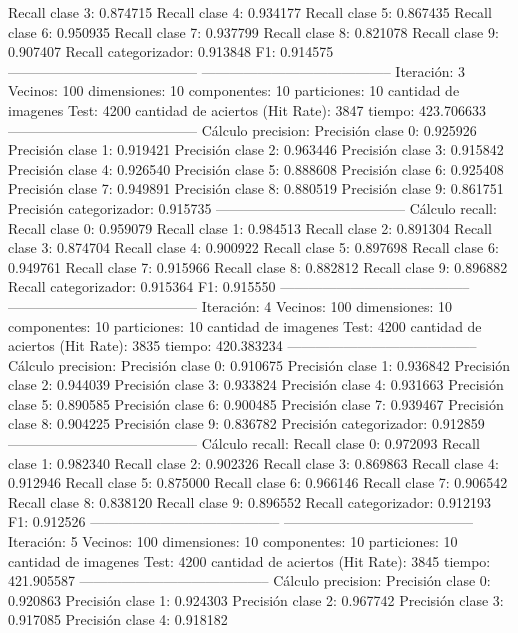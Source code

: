 Recall clase 3: 0.874715
Recall clase 4: 0.934177
Recall clase 5: 0.867435
Recall clase 6: 0.950935
Recall clase 7: 0.937799
Recall clase 8: 0.821078
Recall clase 9: 0.907407
Recall categorizador: 0.913848
F1: 0.914575
-----------------------------------------
-----------------------------------------
Iteración: 3
Vecinos: 100
dimensiones: 10
componentes: 10
particiones: 10
cantidad de imagenes Test: 4200
cantidad de aciertos (Hit Rate): 3847
tiempo: 423.706633
-----------------------------------------
Cálculo precision: 
Precisión clase 0: 0.925926
Precisión clase 1: 0.919421
Precisión clase 2: 0.963446
Precisión clase 3: 0.915842
Precisión clase 4: 0.926540
Precisión clase 5: 0.888608
Precisión clase 6: 0.925408
Precisión clase 7: 0.949891
Precisión clase 8: 0.880519
Precisión clase 9: 0.861751
Precisión categorizador: 0.915735
-----------------------------------------
Cálculo recall: 
Recall clase 0: 0.959079
Recall clase 1: 0.984513
Recall clase 2: 0.891304
Recall clase 3: 0.874704
Recall clase 4: 0.900922
Recall clase 5: 0.897698
Recall clase 6: 0.949761
Recall clase 7: 0.915966
Recall clase 8: 0.882812
Recall clase 9: 0.896882
Recall categorizador: 0.915364
F1: 0.915550
-----------------------------------------
-----------------------------------------
Iteración: 4
Vecinos: 100
dimensiones: 10
componentes: 10
particiones: 10
cantidad de imagenes Test: 4200
cantidad de aciertos (Hit Rate): 3835
tiempo: 420.383234
-----------------------------------------
Cálculo precision: 
Precisión clase 0: 0.910675
Precisión clase 1: 0.936842
Precisión clase 2: 0.944039
Precisión clase 3: 0.933824
Precisión clase 4: 0.931663
Precisión clase 5: 0.890585
Precisión clase 6: 0.900485
Precisión clase 7: 0.939467
Precisión clase 8: 0.904225
Precisión clase 9: 0.836782
Precisión categorizador: 0.912859
-----------------------------------------
Cálculo recall: 
Recall clase 0: 0.972093
Recall clase 1: 0.982340
Recall clase 2: 0.902326
Recall clase 3: 0.869863
Recall clase 4: 0.912946
Recall clase 5: 0.875000
Recall clase 6: 0.966146
Recall clase 7: 0.906542
Recall clase 8: 0.838120
Recall clase 9: 0.896552
Recall categorizador: 0.912193
F1: 0.912526
-----------------------------------------
-----------------------------------------
Iteración: 5
Vecinos: 100
dimensiones: 10
componentes: 10
particiones: 10
cantidad de imagenes Test: 4200
cantidad de aciertos (Hit Rate): 3845
tiempo: 421.905587
-----------------------------------------
Cálculo precision: 
Precisión clase 0: 0.920863
Precisión clase 1: 0.924303
Precisión clase 2: 0.967742
Precisión clase 3: 0.917085
Precisión clase 4: 0.918182
